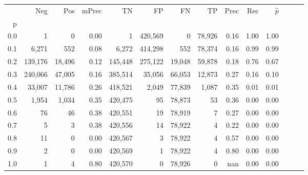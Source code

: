 \begin{tabular}{rrrrrrrrrrrrrr}
\toprule
{} &      Neg &     Pos & mPrec &       TN &       FP &      FN &      TP &  Prec &   Rec & $\hat{p}$ \\
p   &          &         &       &          &          &         &         &       &       &           \\
\midrule
0.0 &        1 &       0 &  0.00 &        1 &  420,569 &       0 &  78,926 &  0.16 &  1.00 &      1.00 \\
0.1 &    6,271 &     552 &  0.08 &    6,272 &  414,298 &     552 &  78,374 &  0.16 &  0.99 &      0.99 \\
0.2 &  139,176 &  18,496 &  0.12 &  145,448 &  275,122 &  19,048 &  59,878 &  0.18 &  0.76 &      0.67 \\
0.3 &  240,066 &  47,005 &  0.16 &  385,514 &   35,056 &  66,053 &  12,873 &  0.27 &  0.16 &      0.10 \\
0.4 &   33,007 &  11,786 &  0.26 &  418,521 &    2,049 &  77,839 &   1,087 &  0.35 &  0.01 &      0.01 \\
0.5 &    1,954 &   1,034 &  0.35 &  420,475 &       95 &  78,873 &      53 &  0.36 &  0.00 &      0.00 \\
0.6 &       76 &      46 &  0.38 &  420,551 &       19 &  78,919 &       7 &  0.27 &  0.00 &      0.00 \\
0.7 &        5 &       3 &  0.38 &  420,556 &       14 &  78,922 &       4 &  0.22 &  0.00 &      0.00 \\
0.8 &       11 &       0 &  0.00 &  420,567 &        3 &  78,922 &       4 &  0.57 &  0.00 &      0.00 \\
0.9 &        2 &       0 &  0.00 &  420,569 &        1 &  78,922 &       4 &  0.80 &  0.00 &      0.00 \\
1.0 &        1 &       4 &  0.80 &  420,570 &        0 &  78,926 &       0 &   nan &  0.00 &      0.00 \\
\bottomrule
\end{tabular}
